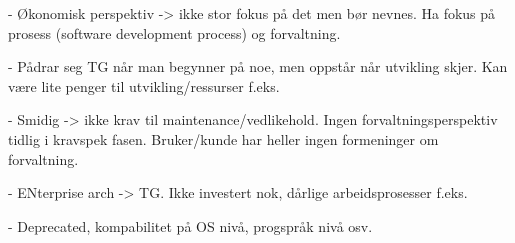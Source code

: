 - Økonomisk perspektiv -> ikke stor fokus på det men bør nevnes. Ha fokus på prosess (software development process) og forvaltning.

- Pådrar seg TG når man begynner på noe, men oppstår når utvikling skjer. Kan være lite penger til utvikling/ressurser f.eks.

- Smidig -> ikke krav til maintenance/vedlikehold. Ingen forvaltningsperspektiv tidlig i kravspek fasen. Bruker/kunde har heller ingen formeninger om forvaltning.

- ENterprise arch -> TG. Ikke investert nok, dårlige arbeidsprosesser f.eks.

- Deprecated, kompabilitet på OS nivå, progspråk nivå osv.